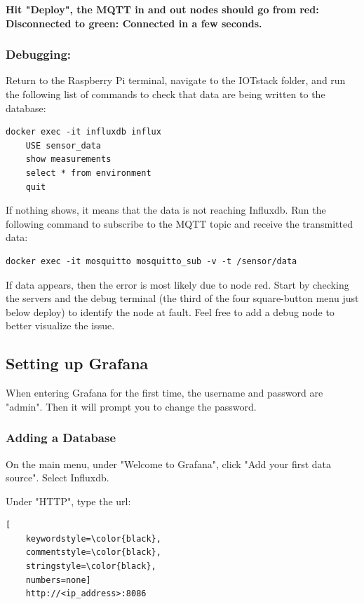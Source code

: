 \documentclass[onecolumn]{article}
\begin{document}
\vspace{1cm}

\textbf{Hit "Deploy", the MQTT in and out nodes should go from red: Disconnected to green: Connected in a few seconds.}

\subsubsection{Debugging:}

Return to the Raspberry Pi terminal, navigate to the IOTstack folder, and run the following list of commands to check that data are being written to the database:
\label{influxdebug}

\begin{lstlisting}[numbers=none]
    docker exec -it influxdb influx
    USE sensor_data
    show measurements
    select * from environment
    quit
\end{lstlisting}

If nothing shows, it means that the data is not reaching Influxdb. Run the following command to subscribe to the MQTT topic and receive the transmitted data:


\begin{lstlisting}[numbers=none]
    docker exec -it mosquitto mosquitto_sub -v -t /sensor/data
\end{lstlisting}

If data appears, then the error is most likely due to node red. Start by checking the servers and the debug terminal (the third of the four square-button menu just below deploy) to identify the node at fault. Feel free to add a debug node to better visualize the issue.


\subsection{Setting up Grafana}
When entering Grafana for the first time, the username and password are "admin". Then it will prompt you to change the password. 

\subsubsection{Adding a Database}
On the main menu, under "Welcome to Grafana", click "Add your first data source". Select Influxdb.

Under "HTTP", type the url:

\begin{lstlisting}[
    keywordstyle=\color{black},
    commentstyle=\color{black},
    stringstyle=\color{black},
    numbers=none]
    http://<ip_address>:8086
\end{lstlisting}
\end{document}
